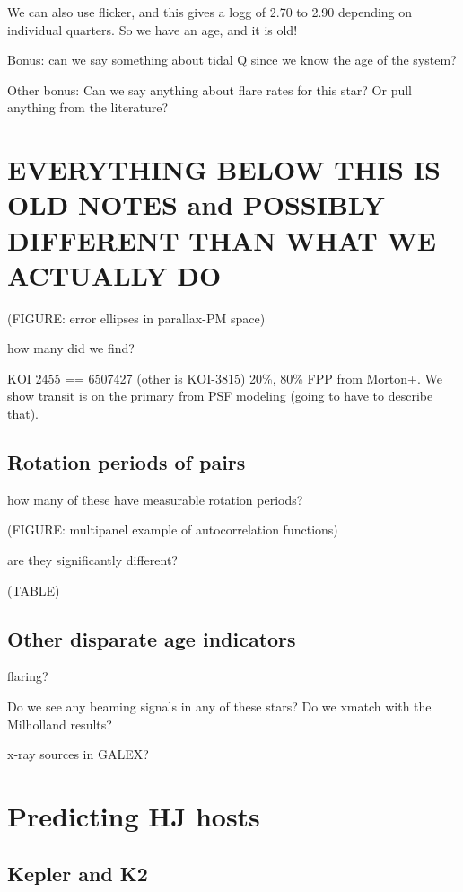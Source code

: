 \documentclass[twocolumn]{aastex62}
\begin{document}
We can also use flicker, and this gives a logg of 2.70 to 2.90 depending on individual quarters. So we have an age, and it is old!

Bonus: can we say something about tidal Q since we know the age of the system?

Other bonus: Can we say anything about flare rates for this star? Or pull anything from the literature?


\section{EVERYTHING BELOW THIS IS OLD NOTES and POSSIBLY DIFFERENT THAN WHAT WE ACTUALLY DO}

(FIGURE: error ellipses in parallax-PM space)

how many did we find?

KOI 2455 == 6507427 (other is KOI-3815) 20\%, 80\% FPP from Morton+. We show transit is on the primary from PSF modeling (going to have to describe that). 






\subsection{Rotation periods of pairs}

how many of these have measurable rotation periods?

(FIGURE: multipanel example of autocorrelation functions)

are they significantly different?

(TABLE)

\subsection{Other disparate age indicators}

flaring?

Do we see any beaming signals in any of these stars? Do we xmatch with the Milholland results?

x-ray sources in GALEX?



\section{Predicting HJ hosts}
\subsection{Kepler and K2}
\end{document}
